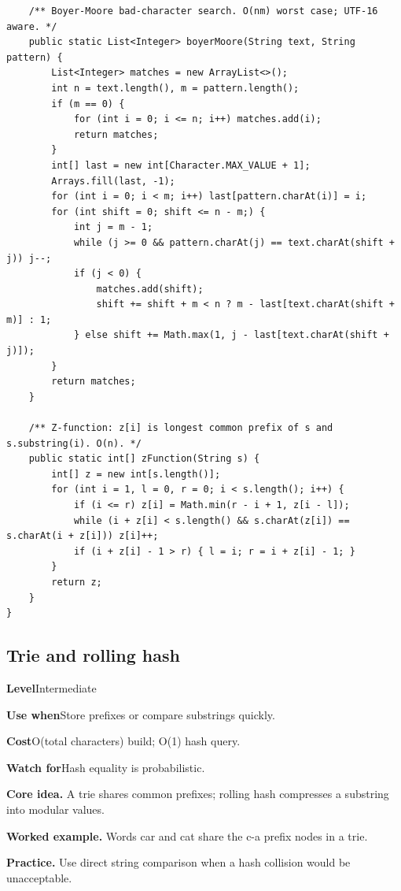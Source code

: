 \documentclass[10pt,letterpaper]{article}
\newcommand{\entrylabel}[1]{\textcolor{accent}{\bfseries #1}}
\begin{document}
\begin{lstlisting}
    /** Boyer-Moore bad-character search. O(nm) worst case; UTF-16 aware. */
    public static List<Integer> boyerMoore(String text, String pattern) {
        List<Integer> matches = new ArrayList<>();
        int n = text.length(), m = pattern.length();
        if (m == 0) {
            for (int i = 0; i <= n; i++) matches.add(i);
            return matches;
        }
        int[] last = new int[Character.MAX_VALUE + 1];
        Arrays.fill(last, -1);
        for (int i = 0; i < m; i++) last[pattern.charAt(i)] = i;
        for (int shift = 0; shift <= n - m;) {
            int j = m - 1;
            while (j >= 0 && pattern.charAt(j) == text.charAt(shift + j)) j--;
            if (j < 0) {
                matches.add(shift);
                shift += shift + m < n ? m - last[text.charAt(shift + m)] : 1;
            } else shift += Math.max(1, j - last[text.charAt(shift + j)]);
        }
        return matches;
    }

    /** Z-function: z[i] is longest common prefix of s and s.substring(i). O(n). */
    public static int[] zFunction(String s) {
        int[] z = new int[s.length()];
        for (int i = 1, l = 0, r = 0; i < s.length(); i++) {
            if (i <= r) z[i] = Math.min(r - i + 1, z[i - l]);
            while (i + z[i] < s.length() && s.charAt(z[i]) == s.charAt(i + z[i])) z[i]++;
            if (i + z[i] - 1 > r) { l = i; r = i + z[i] - 1; }
        }
        return z;
    }
}
\end{lstlisting}
\subsection{Trie and rolling hash}
\begin{guidebox}\small
\entrylabel{Level}\quad Intermediate\par
\entrylabel{Use when}\quad Store prefixes or compare substrings quickly.\par
\entrylabel{Cost}\quad O(total characters) build; O(1) hash query.\par
\entrylabel{Watch for}\quad Hash equality is probabilistic.\par
\end{guidebox}
\noindent\textbf{Core idea.} A trie shares common prefixes; rolling hash compresses a substring into modular values.\par
\noindent\textbf{Worked example.} Words car and cat share the c-a prefix nodes in a trie.\par
\noindent\textbf{Practice.} Use direct string comparison when a hash collision would be unacceptable.\par
\end{document}
